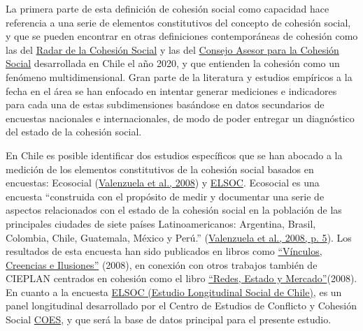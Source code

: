 \documentclass[
  12pt,
]{book}
\begin{document}
La primera parte de esta definición de cohesión social como capacidad hace referencia a una serie de elementos constitutivos del concepto de cohesión social, y que se pueden encontrar en otras definiciones contemporáneas de cohesión como las del \href{https://www.bertelsmann-stiftung.de/en/publications/publication/did/social-cohesion-radar/}{Radar de la Cohesión Social} y las del \href{https://www.desarrollosocialyfamilia.gob.cl/storage/docs/Informe_Final_Consejo_Cohesion_Social.pdf}{Consejo Asesor para la Cohesión Social} desarrollada en Chile el año 2020, y que entienden la cohesión como un fenómeno multidimensional. Gran parte de la literatura y estudios empíricos a la fecha en el área se han enfocado en intentar generar mediciones e indicadores para cada una de estas subdimensiones basándose en datos secundarios de encuestas nacionales e internacionales, de modo de poder entregar un diagnóstico del estado de la cohesión social.

En Chile es posible identificar dos estudios específicos que se han abocado a la medición de los elementos constitutivos de la cohesión social basados en encuestas: Ecosocial (\protect\hyperlink{ref-valenzuela_vinculos_2008}{Valenzuela et al., 2008}) y \href{https://coes.cl/encuesta-panel/}{ELSOC}. Ecosocial es una encuesta ``construida con el propósito de medir y documentar una serie de aspectos relacionados con el estado de la cohesión social en la población de las principales ciudades de siete países Latinoamericanos: Argentina, Brasil, Colombia, Chile, Guatemala, México y Perú.'' (\protect\hyperlink{ref-valenzuela_vinculos_2008}{Valenzuela et al., 2008, p. 5}). Los resultados de esta encuesta han sido publicados en libros como \href{https://www.cieplan.org/wp-content/uploads/2019/12/Libro_Completo_Vinculos_Creencia_e_Ilusiones.pdf}{``Vínculos, Creencias e Ilusiones''} (2008), en conexión con otros trabajos también de CIEPLAN centrados en cohesión como el libro \href{https://www.cieplan.org/wp-content/uploads/2019/12/Libro_Completo_Redes_Estado_y_Mercado_compressed.pdf}{``Redes, Estado y Mercado''}(2008). En cuanto a la encuesta \href{https://coes.cl/encuesta-panel/}{ELSOC (Estudio Longitudinal Social de Chile)}, es un panel longitudinal desarrollado por el Centro de Estudios de Conflicto y Cohesión Social \href{https://www.coes.cl/}{COES}, y que será la base de datos principal para el presente estudio.
\end{document}
